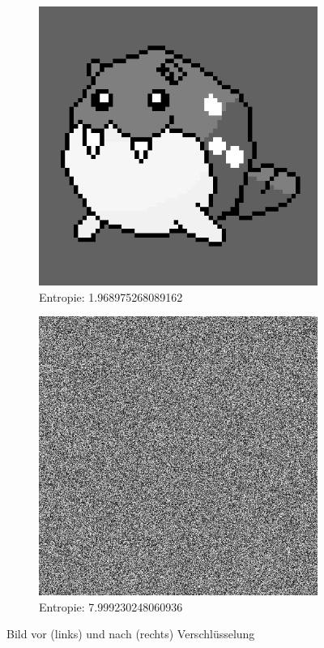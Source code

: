 \begin{figure}
	\centering

	\begin{subfigure}{0.35\textwidth}
		\includegraphics[width=\textwidth]{../1/3/gray_1.968975268089162_spheal.png}
		\caption{Entropie: 1.968975268089162}
	\end{subfigure}
	\hfill
	\begin{subfigure}{0.35\textwidth}
		\includegraphics[width=\textwidth]{../1/3/encrypted_7.999230248060936_spheal.png}
		\caption{Entropie: 7.999230248060936}
	\end{subfigure}

	\caption{Bild vor (links) und nach (rechts) Verschlüsselung}
	\label{fig:spheal}
\end{figure}

